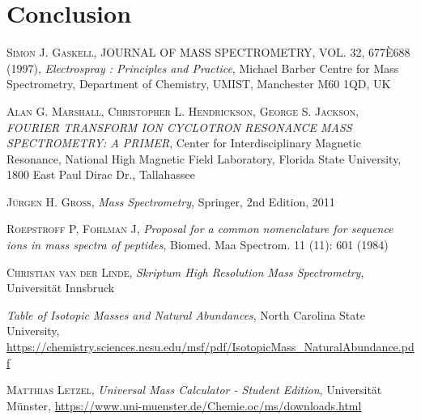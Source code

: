 \documentclass[a4paper,10pt]{article}
\begin{document}
\section{Conclusion}


\begin{thebibliography}{99}
\textsc{Simon J. Gaskell}, JOURNAL OF MASS SPECTROMETRY, VOL. 32, 677È688 (1997), \textit{Electrospray : Principles and Practice}, Michael Barber Centre for Mass Spectrometry, Department of Chemistry, UMIST, Manchester M60 1QD, UK

\textsc{Alan G. Marshall, Christopher L. Hendrickson, George S. Jackson}, \textit{FOURIER TRANSFORM ION CYCLOTRON RESONANCE MASS SPECTROMETRY: A PRIMER}, Center for Interdisciplinary Magnetic Resonance, National High Magnetic Field Laboratory, Florida State University, 1800 East Paul Dirac Dr., Tallahassee

\textsc{Jürgen H. Gross}, \textit{Mass Spectrometry}, Springer, 2nd Edition, 2011

\textsc{Roepstroff P, Fohlman J}, \textit{Proposal for a common nomenclature for sequence ions in mass spectra of peptides}, Biomed. Maa Spectrom. 11 (11): 601 (1984)

\textsc{Christian van der Linde}, \textit{Skriptum High Resolution Mass Spectrometry}, Universität Innsbruck

\textit{Table of Isotopic Masses and Natural Abundances}, North Carolina State University, \url{https://chemistry.sciences.ncsu.edu/msf/pdf/IsotopicMass_NaturalAbundance.pdf}

\textsc{Matthias Letzel}, \textit{Universal Mass Calculator - Student Edition}, Universität Münster, \url{https://www.uni-muenster.de/Chemie.oc/ms/downloads.html}

\end{thebibliography}
\end{document}
